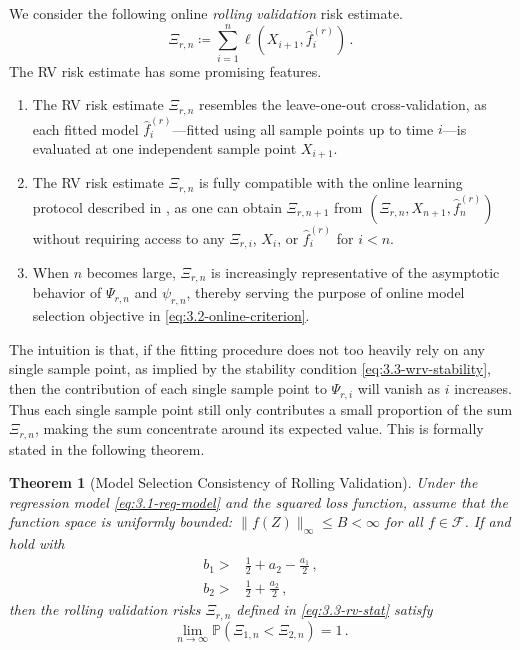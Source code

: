 \documentclass[11pt]{article}
\theoremstyle{plain}
\newtheorem{theorem}{Theorem}[section]
\begin{document}
We consider the following online \emph{rolling validation}  risk estimate.
\begin{equation}\label{eq:3.3-rv-stat}
\Xi_{r,n} \coloneqq \sum_{i=1}^n \ell(X_{i+1},\hat f^{(r)}_{i})\,.
\end{equation}
The RV risk estimate has some promising features.
\begin{enumerate}
    \item The RV risk estimate $\Xi_{r,n}$ resembles the leave-one-out cross-validation, as each fitted model $\hat f_i^{(r)}$---fitted using all sample points up to time $i$---is evaluated at one independent sample point $X_{i+1}$.
    \item The RV risk estimate $\Xi_{r,n}$ is fully compatible with the online learning protocol described in , as one can obtain $\Xi_{r,n+1}$ from $(\Xi_{r,n},X_{n+1},\hat f_n^{(r)})$ without requiring access to any $\Xi_{r,i}$, $X_i$, or $\hat f_i^{(r)}$ for $i<n$.
    \item When $n$ becomes large, $\Xi_{r,n}$ is increasingly representative of the asymptotic behavior of $\Psi_{r,n}$ and $\psi_{r,n}$, thereby serving the purpose of online model selection objective in \eqref{eq:3.2-online-criterion}.
\end{enumerate}
The intuition is that, if the fitting procedure does not too heavily rely on any single sample point, as implied by the stability condition \eqref{eq:3.3-wrv-stability}, then the contribution of each single sample point to $\Psi_{r,i}$ will vanish as $i$ increases.  Thus each single sample point still only contributes a small proportion of the sum $\Xi_{r,n}$, making the sum concentrate around its expected value.  This is formally stated in the following theorem.
\begin{theorem}[Model Selection Consistency of Rolling Validation]\label{thm:3.3-wrv-consistency}
Under the regression model \eqref{eq:3.1-reg-model} and the squared loss function,
assume that the function space is uniformly bounded: $\|f(Z)\|_\infty\le B<\infty$ for all $f\in\mathcal F$.
   If  and  hold with \begin{align*}
         b_1> &\frac{1}{2}+a_2-\frac{a_1}{2}\,,  \\
         b_2> & \frac{1}{2}+\frac{a_2}{2} \,,
\end{align*}
then the rolling validation risks $\Xi_{r,n}$ defined in \eqref{eq:3.3-rv-stat} satisfy
$$
\lim_{n\rightarrow \infty}\mathbb P(\Xi_{1,n}<\Xi_{2,n})= 1\,.
$$
\end{theorem}
\end{document}
